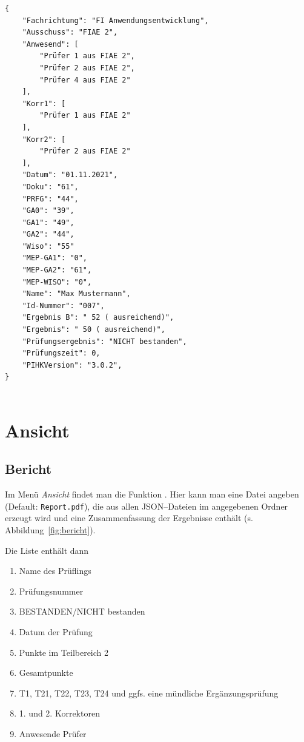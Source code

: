 \documentclass[a4paper,notitlepage,parskip=half]{scrartcl}
\newcommand{\cfile}[1]{{\texttt{#1}}}
\begin{document}
\begin{minipage}[t]{\textwidth}
\begin{lstlisting}[numbers=none,caption={\cfile{Gesicherte Datei: $20160621Max\_Mustermann13145678.txt$}},label=lst:datei]
{
    "Fachrichtung": "FI Anwendungsentwicklung",
    "Ausschuss": "FIAE 2",
    "Anwesend": [
        "Prüfer 1 aus FIAE 2",
        "Prüfer 2 aus FIAE 2",
        "Prüfer 4 aus FIAE 2"
    ],
    "Korr1": [
        "Prüfer 1 aus FIAE 2"
    ],
    "Korr2": [
        "Prüfer 2 aus FIAE 2"
    ],
    "Datum": "01.11.2021",
    "Doku": "61",
    "PRFG": "44",
    "GA0": "39",
    "GA1": "49",
    "GA2": "44",
    "Wiso": "55"
    "MEP-GA1": "0",
    "MEP-GA2": "61",
    "MEP-WISO": "0",
    "Name": "Max Mustermann",
    "Id-Nummer": "007",
    "Ergebnis B": " 52 ( ausreichend)",
    "Ergebnis": " 50 ( ausreichend)",
    "Prüfungsergebnis": "NICHT bestanden",
    "Prüfungszeit": 0,
    "PIHKVersion": "3.0.2",
}


\end{lstlisting}
\end{minipage}

\section{Ansicht}
\subsection{Bericht}
Im Menü \emph{Ansicht} findet man die Funktion .
Hier kann man eine Datei angeben (Default: \texttt{Report.pdf}), die aus allen JSON--Dateien im angegebenen Ordner erzeugt wird und eine Zusammenfassung der Ergebnisse enthält (s. Abbildung~\ref{fig:bericht}).

Die Liste enthält dann

\begin{enumerate}
 \item Name des Prüflings
 \item Prüfungsnummer
 \item BESTANDEN/NICHT bestanden
 \item Datum der Prüfung
 \item Punkte im Teilbereich 2
 \item Gesamtpunkte
 \item T1, T21, T22, T23, T24 und ggfs. eine mündliche Ergänzungsprüfung
 \item 1. und 2. Korrektoren
 \item Anwesende Prüfer
 \end{enumerate} 
\end{document}
